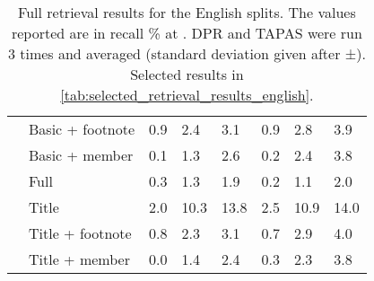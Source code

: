 \documentclass[11pt]{article}
\begin{document}
\begin{table*}[h]
\begin{tabular}{llllllll}
     & Basic + footnote &          0.9 &          2.4 &          3.1 &          0.9 &          2.8 &          3.9 \\
     & Basic + member &          0.1 &          1.3 &          2.6 &          0.2 &          2.4 &          3.8 \\
     & Full &          0.3 &          1.3 &          1.9 &          0.2 &          1.1 &          2.0 \\
     & Title &          2.0 &         10.3 &         13.8 &          2.5 &         10.9 &         14.0 \\
     & Title + footnote &          0.8 &          2.3 &          3.1 &          0.7 &          2.9 &          4.0 \\
     & Title + member &          0.0 &          1.4 &          2.4 &          0.3 &          2.3 &          3.8 \\
\bottomrule
\end{tabular}
    \caption{Full retrieval results for the English splits. The values reported are in recall \% at . DPR and TAPAS were run 3 times and averaged (standard deviation given after ±). Selected results in \autoref{tab:selected_retrieval_results_english}.}
    \label{tab:full_retrieval_results_english}
\end{table*}
\end{document}
